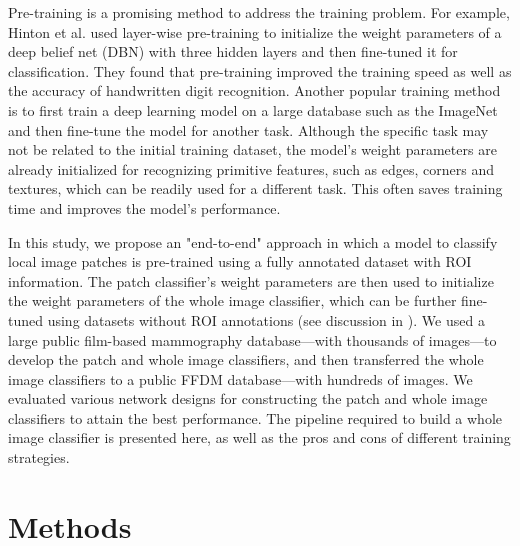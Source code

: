 \documentclass[12pt,letterpaper]{article}
\begin{document}
Pre-training is a promising method to address the training problem. For example, Hinton et al. \cite{hinton_fast_2006} used layer-wise pre-training to initialize the weight parameters of a deep belief net (DBN) with three hidden layers and then fine-tuned it for classification. They found that pre-training improved the training speed as well as the accuracy of handwritten digit recognition. Another popular training method is to first train a deep learning model on a large database such as the ImageNet \cite{russakovsky_imagenet_2015} and then fine-tune the model for another task. Although the specific task may not be related to the initial training dataset, the model's weight parameters are already initialized for recognizing primitive features, such as edges, corners and textures, which can be readily used for a different task. This often saves training time and improves the model's performance.

In this study, we propose an "end-to-end" approach in which a model to classify local image patches is pre-trained using a fully annotated dataset with ROI information. The patch classifier's weight parameters are then used to initialize the weight parameters of the whole image classifier, which can be further fine-tuned using datasets without ROI annotations (see discussion in \cite{shen_breast_2017}). We used a large public film-based mammography database---with thousands of images---to develop the patch and whole image classifiers, and then transferred the whole image classifiers to a public FFDM database---with hundreds of images. We evaluated various network designs for constructing the patch and whole image classifiers to attain the best performance. The pipeline required to build a whole image classifier is presented here, as well as the pros and cons of different training strategies.

\section{Methods}
\end{document}
